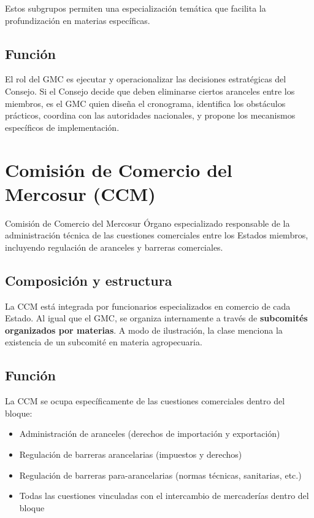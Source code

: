 \documentclass[12pt,oneside]{book}
\begin{document}
Estos subgrupos permiten una especialización temática que facilita la profundización en materias específicas.

\subsection{Función}

El rol del GMC es ejecutar y operacionalizar las decisiones estratégicas del Consejo. Si el Consejo decide que deben eliminarse ciertos aranceles entre los miembros, es el GMC quien diseña el cronograma, identifica los obstáculos prácticos, coordina con las autoridades nacionales, y propone los mecanismos específicos de implementación.

\section{Comisión de Comercio del Mercosur (CCM)}

\begin{definition}{Comisión de Comercio del Mercosur}
Órgano especializado responsable de la administración técnica de las cuestiones comerciales entre los Estados miembros, incluyendo regulación de aranceles y barreras comerciales.
\end{definition}

\subsection{Composición y estructura}

La CCM está integrada por funcionarios especializados en comercio de cada Estado. Al igual que el GMC, se organiza internamente a través de \textbf{subcomités organizados por materias}. A modo de ilustración, la clase menciona la existencia de un subcomité en materia agropecuaria.

\subsection{Función}

La CCM se ocupa específicamente de las cuestiones comerciales dentro del bloque:

\begin{itemize}
\item Administración de aranceles (derechos de importación y exportación)
\item Regulación de barreras arancelarias (impuestos y derechos)
\item Regulación de barreras para-arancelarias (normas técnicas, sanitarias, etc.)
\item Todas las cuestiones vinculadas con el intercambio de mercaderías dentro del bloque
\end{itemize}
\end{document}
